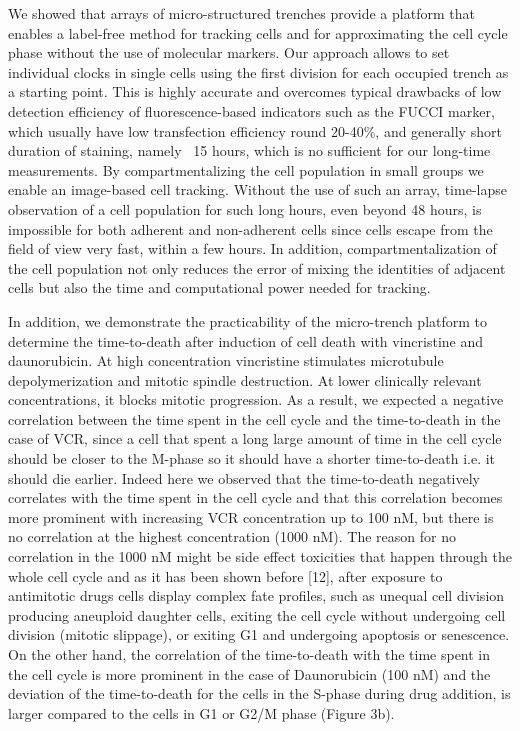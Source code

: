 \documentclass[pdftex,12pt,a4paper]{report}
\begin{document}
We showed that arrays of micro-structured trenches provide a platform that enables a label-free method for tracking cells and for approximating the cell cycle phase without the use of molecular markers. Our approach allows to set individual clocks in single cells using the first division for each occupied trench as a starting point. This is highly accurate and overcomes typical drawbacks of low detection efficiency of fluorescence-based indicators such as the FUCCI marker, which usually have low transfection efficiency round 20-40\%, and generally short duration of staining, namely ~15 hours, which is no sufficient for our long-time measurements. By compartmentalizing the cell population in small groups we enable an image-based cell tracking. Without the use of such an array, time-lapse observation of a cell population for such long hours, even beyond 48 hours, is impossible for both adherent and non-adherent cells since cells escape from the field of view very fast, within a few hours. In addition, compartmentalization of the cell population not only reduces the error of mixing the identities of adjacent cells but also the time and computational power needed for tracking.

In addition, we demonstrate the practicability of the micro-trench platform to determine the time-to-death after induction of cell death with vincristine and daunorubicin. At high concentration vincristine stimulates microtubule depolymerization and mitotic spindle destruction. At lower clinically relevant concentrations, it blocks mitotic progression. As a result, we expected a negative correlation between the time spent in the cell cycle and the time-to-death in the case of VCR, since a cell that spent a long large amount of time in the cell cycle should be closer to the M-phase so it should have a shorter time-to-death i.e. it should die earlier. Indeed here we observed that the time-to-death negatively correlates with the time spent in the cell cycle and that this correlation becomes more prominent with increasing VCR concentration up to 100 nM, but there is no correlation at the highest concentration (1000 nM). The reason for no correlation in the 1000 nM might be side effect toxicities that happen through the whole cell cycle and as it has been shown before [12], after exposure to antimitotic drugs cells display complex fate profiles, such as unequal cell division producing aneuploid daughter cells, exiting the cell cycle without undergoing cell division (mitotic slippage), or exiting G1 and undergoing apoptosis or senescence. On the other hand, the correlation of the time-to-death with the time spent in the cell cycle is more prominent in the case of Daunorubicin (100 nM) and the deviation of the time-to-death for the cells in the S-phase during drug addition, is larger compared to the cells in G1 or G2/M phase (Figure 3b).
\end{document}
